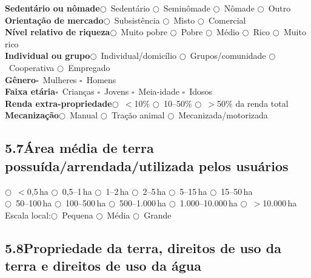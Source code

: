 \noindent\textbf{Sedentário ou nômade}\quad $\bigcirc$~Sedentário \quad $\bigcirc$~Seminômade \quad $\bigcirc$~Nômade \quad $\bigcirc$~Outro\\[4pt]
\textbf{Orientação de mercado}\quad $\bigcirc$~Subsistência \quad $\bigcirc$~Misto \quad $\bigcirc$~Comercial\\[4pt]
\textbf{Nível relativo de riqueza}\quad $\bigcirc$~Muito pobre \quad $\bigcirc$~Pobre \quad $\bigcirc$~Médio \quad $\bigcirc$~Rico \quad $\bigcirc$~Muito rico\\[4pt]
\textbf{Individual ou grupo}\quad $\bigcirc$~Individual/domicílio \quad $\bigcirc$~Grupos/comunidade \quad $\bigcirc$~Cooperativa \quad $\bigcirc$~Empregado\\[4pt]
\textbf{Gênero}\quad $\square$~Mulheres \quad $\square$~Homens\\[4pt]
\textbf{Faixa etária}\quad $\square$~Crianças \quad $\square$~Jovens \quad $\square$~Meia-idade \quad $\square$~Idosos\\[4pt]
\textbf{Renda extra-propriedade}\quad $\bigcirc$~$<$10\% \quad $\bigcirc$~10--50\% \quad $\bigcirc$~$>$50\% da renda total\\[4pt]
\textbf{Mecanização}\quad $\bigcirc$~Manual \quad $\bigcirc$~Tração animal \quad $\bigcirc$~Mecanizada/motorizada

\subsection{5.7\quad Área média de terra possuída/arrendada/utilizada pelos usuários}

$\bigcirc$~$<$0,5\,ha \quad $\bigcirc$~0,5--1\,ha \quad $\bigcirc$~1--2\,ha \quad $\bigcirc$~2--5\,ha \quad $\bigcirc$~5--15\,ha \quad $\bigcirc$~15--50\,ha\\
$\bigcirc$~50--100\,ha \quad $\bigcirc$~100--500\,ha \quad $\bigcirc$~500--1.000\,ha \quad $\bigcirc$~1.000--10.000\,ha \quad $\bigcirc$~$>$10.000\,ha\\[4pt]
Escala local:\quad $\bigcirc$~Pequena \quad $\bigcirc$~Média \quad $\bigcirc$~Grande

\subsection{5.8\quad Propriedade da terra, direitos de uso da terra e direitos de uso da água}

